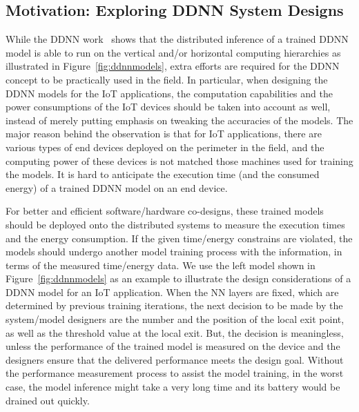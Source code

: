 \documentclass[conference]{IEEEtran}
\def\figurename{Figure}
\begin{document}
\subsection{Motivation: Exploring DDNN System Designs}
\label{sec:motivation}
While the DDNN work~\cite{Teerapittayanon17} shows that the distributed inference of a trained DDNN model is able to run on the vertical and/or horizontal computing hierarchies as illustrated in \figurename~\ref{fig:ddnnmodels}, extra efforts are required for the DDNN concept to be practically used in the field. In particular, when designing the DDNN models for the IoT applications, the computation capabilities and the power consumptions of the IoT devices should be taken into account as well, instead of merely putting emphasis on tweaking the accuracies of the models. The major reason behind the observation is that for IoT applications, there are various types of end devices deployed on the perimeter in the field, and the computing power of these devices is not matched those machines used for training the models. It is hard to anticipate the execution time (and the consumed energy) of a trained DDNN model on an end device.

For better and efficient software/hardware co-designs, these trained models should be deployed onto the distributed systems to measure the execution times and the energy consumption. If the given time/energy constrains are violated, the models should undergo another model training process with the information, in terms of the measured time/energy data. We use the left model shown in \figurename~\ref{fig:ddnnmodels} as an example to illustrate the design considerations of a DDNN model for an IoT application. When the NN layers are fixed, which are determined by previous training iterations, the next decision to be made by the system/model designers are the number and the position of the local exit point, as well as the threshold value at the local exit. But, the decision is meaningless, unless the performance of the trained model is measured on the device and the designers ensure that the delivered performance meets the design goal. Without the performance measurement process to assist the model training, in the worst case, the model inference might take a very long time and its battery would be drained out quickly.
\end{document}
